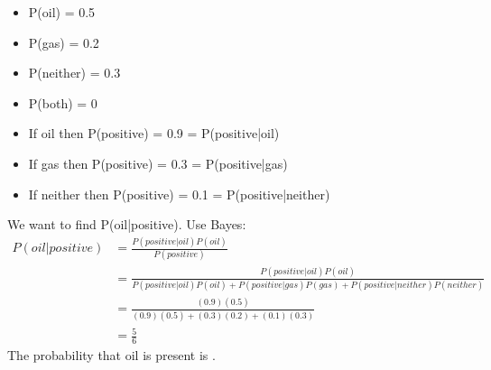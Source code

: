 \documentclass[]{homework}
\begin{document}
\question
\begin{itemize}
    \item P(oil) = 0.5
    \item P(gas) = 0.2
    \item P(neither) = 0.3
    \item P(both) = 0
    \item If oil then P(positive) = 0.9 = P(positive|oil)
    \item If gas then P(positive) = 0.3 = P(positive|gas)
    \item If neither then P(positive) = 0.1 = P(positive|neither)
\end{itemize}
We want to find P(oil|positive). Use Bayes:
\begin{align*}
    P(oil|positive) &= \frac{P(positive|oil)P(oil)}{P(positive)}    \\
                    &= \frac{P(positive|oil)P(oil)}{P(positive|oil)P(oil) + P(positive|gas)P(gas) + P(positive|neither)P(neither)}    \\
                    &= \frac{(0.9)(0.5)}{(0.9)(0.5) + (0.3)(0.2) + (0.1)(0.3)}  \\
                    &= \frac{5}{6}
\end{align*}
The probability that oil is present is .
\end{document}
